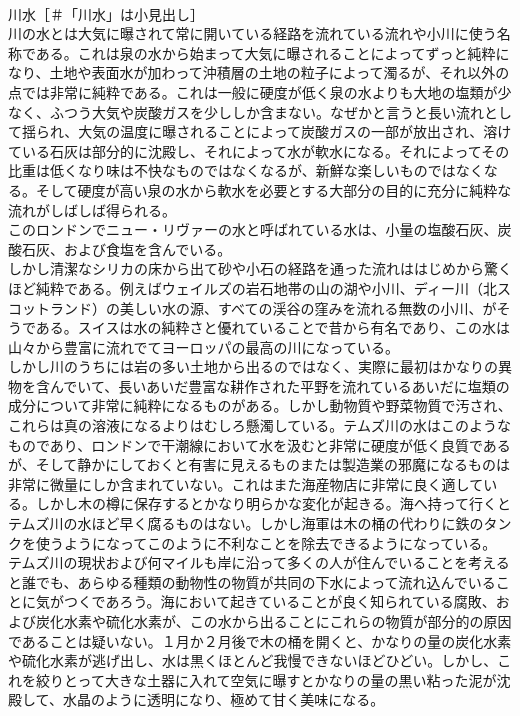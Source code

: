 \documentclass[8pt]{extreport}
\begin{document}
\begin{CJK}{UTF8}{min}
\\	川水［＃「川水」は小見出し］
\\	川の水とは大気に曝されて常に開いている経路を流れている流れや小川に使う名称である。これは泉の水から始まって大気に曝されることによってずっと純粋になり、土地や表面水が加わって沖積層の土地の粒子によって濁るが、それ以外の点では非常に純粋である。これは一般に硬度が低く泉の水よりも大地の塩類が少なく、ふつう大気や炭酸ガスを少ししか含まない。なぜかと言うと長い流れとして揺られ、大気の温度に曝されることによって炭酸ガスの一部が放出され、溶けている石灰は部分的に沈殿し、それによって水が軟水になる。それによってその比重は低くなり味は不快なものではなくなるが、新鮮な楽しいものではなくなる。そして硬度が高い泉の水から軟水を必要とする大部分の目的に充分に純粋な流れがしばしば得られる。
\\	このロンドンでニュー・リヴァーの水と呼ばれている水は、小量の塩酸石灰、炭酸石灰、および食塩を含んでいる。
\\	しかし清潔なシリカの床から出て砂や小石の経路を通った流れははじめから驚くほど純粋である。例えばウェイルズの岩石地帯の山の湖や小川、ディー川（北スコットランド）の美しい水の源、すべての渓谷の窪みを流れる無数の小川、がそうである。スイスは水の純粋さと優れていることで昔から有名であり、この水は山々から豊富に流れでてヨーロッパの最高の川になっている。
\\	しかし川のうちには岩の多い土地から出るのではなく、実際に最初はかなりの異物を含んでいて、長いあいだ豊富な耕作された平野を流れているあいだに塩類の成分について非常に純粋になるものがある。しかし動物質や野菜物質で汚され、これらは真の溶液になるよりはむしろ懸濁している。テムズ川の水はこのようなものであり、ロンドンで干潮線において水を汲むと非常に硬度が低く良質であるが、そして静かにしておくと有害に見えるものまたは製造業の邪魔になるものは非常に微量にしか含まれていない。これはまた海産物店に非常に良く適している。しかし木の樽に保存するとかなり明らかな変化が起きる。海へ持って行くとテムズ川の水ほど早く腐るものはない。しかし海軍は木の桶の代わりに鉄のタンクを使うようになってこのように不利なことを除去できるようになっている。
\\	テムズ川の現状および何マイルも岸に沿って多くの人が住んでいることを考えると誰でも、あらゆる種類の動物性の物質が共同の下水によって流れ込んでいることに気がつくであろう。海において起きていることが良く知られている腐敗、および炭化水素や硫化水素が、この水から出ることにこれらの物質が部分的の原因であることは疑いない。１月か２月後で木の桶を開くと、かなりの量の炭化水素や硫化水素が逃げ出し、水は黒くほとんど我慢できないほどひどい。しかし、これを絞りとって大きな土器に入れて空気に曝すとかなりの量の黒い粘った泥が沈殿して、水晶のように透明になり、極めて甘く美味になる。

\end{CJK}
\end{document}
